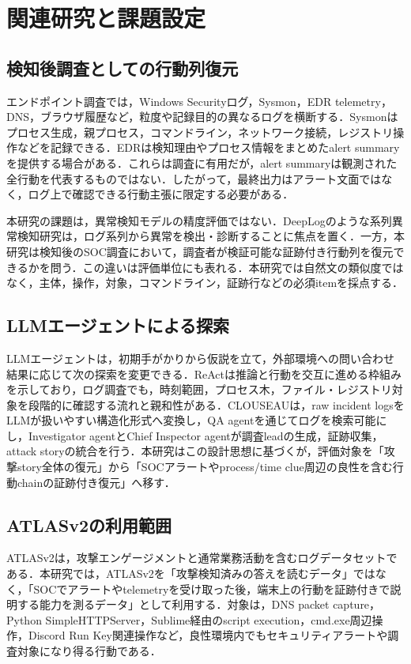 ﻿

\section{関連研究と課題設定}

\subsection{検知後調査としての行動列復元}

エンドポイント調査では，Windows Securityログ，Sysmon，EDR telemetry，DNS，ブラウザ履歴など，粒度や記録目的の異なるログを横断する．Sysmonはプロセス生成，親プロセス，コマンドライン，ネットワーク接続，レジストリ操作などを記録できる\cite{sysmon}．EDRは検知理由やプロセス情報をまとめたalert summaryを提供する場合がある．これらは調査に有用だが，alert summaryは観測された全行動を代表するものではない．したがって，最終出力はアラート文面ではなく，ログ上で確認できる行動主張に限定する必要がある．

本研究の課題は，異常検知モデルの精度評価ではない．DeepLogのような系列異常検知研究は，ログ系列から異常を検出・診断することに焦点を置く\cite{deeplog}．一方，本研究は検知後のSOC調査において，調査者が検証可能な証跡付き行動列を復元できるかを問う．この違いは評価単位にも表れる．本研究では自然文の類似度ではなく，主体，操作，対象，コマンドライン，証跡行などの必須itemを採点する．

\subsection{LLMエージェントによる探索}

LLMエージェントは，初期手がかりから仮説を立て，外部環境への問い合わせ結果に応じて次の探索を変更できる．ReActは推論と行動を交互に進める枠組みを示しており\cite{react}，ログ調査でも，時刻範囲，プロセス木，ファイル・レジストリ対象を段階的に確認する流れと親和性がある．CLOUSEAUは，raw incident logsをLLMが扱いやすい構造化形式へ変換し，QA agentを通じてログを検索可能にし，Investigator agentとChief Inspector agentが調査leadの生成，証跡収集，attack storyの統合を行う\cite{clouseau}．本研究はこの設計思想に基づくが，評価対象を「攻撃story全体の復元」から「SOCアラートやprocess/time clue周辺の良性を含む行動chainの証跡付き復元」へ移す．

\subsection{ATLASv2の利用範囲}

ATLASv2は，攻撃エンゲージメントと通常業務活動を含むログデータセットである\cite{atlasv2}．本研究では，ATLASv2を「攻撃検知済みの答えを読むデータ」ではなく，「SOCでアラートやtelemetryを受け取った後，端末上の行動を証跡付きで説明する能力を測るデータ」として利用する．対象は，DNS packet capture，Python SimpleHTTPServer，Sublime経由のscript execution，cmd.exe周辺操作，Discord Run Key関連操作など，良性環境内でもセキュリティアラートや調査対象になり得る行動である．


